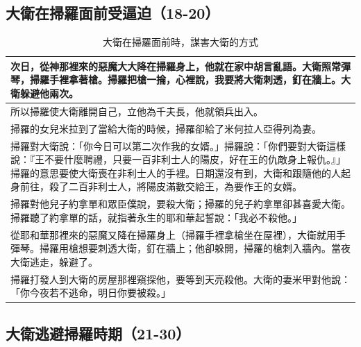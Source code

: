 \documentclass{ctexart}
\begin{document}
\subsection{大衛在掃羅面前受逼迫（18-20）}
\begin{table}[!hbp]
\centering 
\begin{tabular}{|p{18cm}|}
\hline
\hline
次日，從神那裡來的惡魔大大降在掃羅身上，他就在家中胡言亂語。大衛照常彈琴，掃羅手裡拿著槍。掃羅把槍一掄，心裡說，我要將大衛刺透，釘在牆上。大衛躲避他兩次。 \\\hline
所以掃羅使大衛離開自己，立他為千夫長，他就領兵出入。\\\hline
掃羅的女兒米拉到了當給大衛的時候，掃羅卻給了米何拉人亞得列為妻。\\\hline
掃羅對大衛說：「你今日可以第二次作我的女婿。」掃羅說：「你們要對大衛這樣說：『王不要什麼聘禮，只要一百非利士人的陽皮，好在王的仇敵身上報仇。』」掃羅的意思要使大衛喪在非利士人的手裡。日期還沒有到，大衛和跟隨他的人起身前往，殺了二百非利士人，將陽皮滿數交給王，為要作王的女婿。\\\hline
掃羅對他兒子約拿單和眾臣僕說，要殺大衛；掃羅的兒子約拿單卻甚喜愛大衛。掃羅聽了約拿單的話，就指著永生的耶和華起誓說：「我必不殺他。」\\\hline
從耶和華那裡來的惡魔又降在掃羅身上（掃羅手裡拿槍坐在屋裡），大衛就用手彈琴。掃羅用槍想要刺透大衛，釘在牆上；他卻躲開，掃羅的槍刺入牆內。當夜大衛逃走，躲避了。 \\\hline  
掃羅打發人到大衛的房屋那裡窺探他，要等到天亮殺他。大衛的妻米甲對他說：「你今夜若不逃命，明日你要被殺。」\\\hline
\end{tabular}
\caption{大衛在掃羅面前時，謀害大衛的方式}
\end{table}

\subsection{大衛逃避掃羅時期（21-30）}
\end{document}
